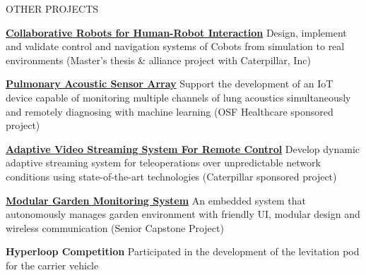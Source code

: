 \documentclass{lib/resume} %
\begin{document}
\begin{rSection}{OTHER PROJECTS}
    \vspace{-1em}
    \item \href{https://liu2g.github.io/cobots-sim/}{\textbf{Collaborative Robots for Human-Robot Interaction}} Design, implement and validate control and navigation systems of Cobots from simulation to real environments (Master's thesis \& alliance project with Caterpillar, Inc)
    \item \href{https://liu2g.github.io/pasta/}{\textbf{Pulmonary Acoustic Sensor Array}} Support the development of an IoT device capable of monitoring multiple channels of lung acoustics simultaneously and remotely diagnosing with machine learning (OSF Healthcare sponsored project)
    \item \href{https://liu2g.github.io/teleop-video/}{\textbf{Adaptive Video Streaming System For Remote Control}} {Develop dynamic adaptive streaming system for teleoperations over unpredictable network conditions using state-of-the-art technologies (Caterpillar sponsored project)}
    \item \href{https://github.com/liu2g/mgms}{\textbf{Modular Garden Monitoring System}} {An embedded system that autonomously manages garden environment with friendly UI, modular design and wireless communication (Senior Capstone Project)}
    \item \textbf{Hyperloop Competition} {Participated in the development of the levitation pod for the carrier vehicle}

\end{rSection}
\end{document}
